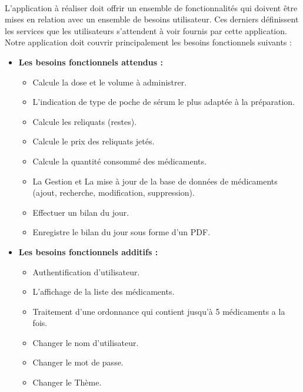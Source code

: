 \documentclass[12pt, openany]{report}
\begin{document}
\paragraph{}
L’application à réaliser doit offrir un ensemble de fonctionnalités qui doivent être mises en relation avec un ensemble de besoins utilisateur. Ces derniers définissent les services que les utilisateurs s’attendent à voir fournis par cette application. \\
Notre application doit couvrir principalement les besoins fonctionnels suivants : \\
\begin{itemize}\renewcommand {\labelitemi }{$\bullet $}
	\item \textbf{Les besoins fonctionnels attendus :}
	\begin{itemize}
		\vspace{5mm}
		
		
		\item Calcule la dose et le volume à administrer.
		\item L'indication de type de poche de sérum le plus adaptée à la préparation.
		\item Calcule les reliquats (restes).
		\item Calcule le prix des reliquats jetés.
		\item Calcule la quantité consommé des médicaments. 
		\item La Gestion et La mise à jour de la base de données de médicaments (ajout, recherche, modification, suppression).
		\item Effectuer un bilan du jour.
		\item Enregistre le bilan du jour sous forme d'un PDF.
		\vspace{5mm}
	\end{itemize}
	
	\item \textbf{Les besoins fonctionnels additifs : }
	\begin{itemize}
		\vspace{5mm}
		\item Authentification d'utilisateur.
		\item L'affichage de la liste des médicaments.
		\item Traitement d'une ordonnance qui contient jusqu'à 5 médicaments a la fois.
		\item Changer le nom d'utilisateur.
		\item Changer le mot de passe.
		\item Changer le Thème.
		
 	\end{itemize}
\end{itemize}
\end{document}
